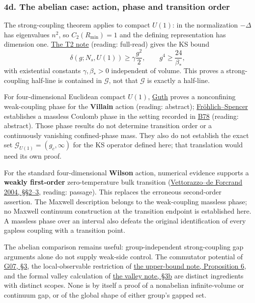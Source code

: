 \documentclass[11pt,a4paper]{article}
\begin{document}
\subsubsection{4d. The abelian case: action, phase and transition
order}\label{d.-the-abelian-case-action-phase-and-transition-order}

The strong-coupling theorem applies to compact \(U(1)\): in the
normalization \(-\Delta\) has eigenvalues \(n^2\), so
\(C_2(R_{\min})=1\) and the defining representation has dimension one.
\href{strong-coupling-uniform-gap.md}{The T2 note} (reading: full-read)
gives the KS bound \[\delta(g;N_s,U(1))\ge\gamma\frac{g^2}{2},\qquad
g^4\ge\frac{24}{\beta_*},\] with existential constants
\(\gamma,\beta_*>0\) independent of volume. This proves a
strong-coupling half-line is contained in \(\mathcal G\), not that
\(\mathcal G\) is exactly a half-line.

For four-dimensional Euclidean compact \(U(1)\),
\href{https://doi.org/10.1103/PhysRevD.21.2291}{Guth} proves a
nonconfining weak-coupling phase for the \textbf{Villain} action
(reading: abstract);
\href{https://doi.org/10.1007/BF01213610}{Fröhlich--Spencer} establishes
a massless Coulomb phase in the setting recorded in
\href{../references/batches/B78.md}{B78} (reading: abstract). Those
phase results do not determine transition order or a continuously
vanishing confined-phase mass. They also do not establish the exact set
\(\mathcal G_{U(1)}=(g_c,\infty)\) for the KS operator defined here;
that translation would need its own proof.

For the standard four-dimensional \textbf{Wilson} action, numerical
evidence supports a \textbf{weakly first-order} zero-temperature bulk
transition
(\href{https://arxiv.org/html/hep-lat/0409135v2}{Vettorazzo--de Forcrand
2004, §§2--3}, reading: passage). This replaces the erroneous
second-order assertion. The Maxwell description belongs to the
weak-coupling massless phase; no Maxwell continuum construction at the
transition endpoint is established here. A massless phase over an
interval also defeats the original identification of every gapless
coupling with a transition point.

The abelian comparison remains useful: group-independent strong-coupling
gap arguments alone do not supply weak-side control. The commutator
potential of \href{low-dimensional-mass-gap.md}{G07, §3}, the
local-observable restriction of \href{lattice-gap-upper-bounds.md}{the
upper-bound note, Proposition 6}, and the formal valley calculation of
\href{torus-valley-potential.md}{the valley note, §3b} are distinct
ingredients with distinct scopes. None is by itself a proof of a
nonabelian infinite-volume or continuum gap, or of the global shape of
either group's gapped set.
\end{document}

